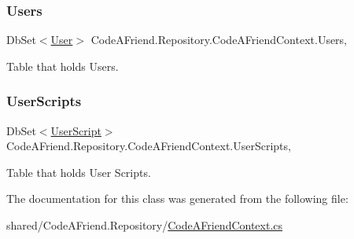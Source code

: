 \subsubsection{\texorpdfstring{Users}{Users}}
{\footnotesize\ttfamily Db\+Set$<$\mbox{\hyperlink{class_code_a_friend_1_1_data_model_1_1_user}{User}}$>$ Code\+A\+Friend.\+Repository.\+Code\+A\+Friend\+Context.\+Users\hspace{0.3cm}{\ttfamily [get]}, {\ttfamily [set]}}



Table that holds Users.

\mbox{\label{class_code_a_friend_1_1_repository_1_1_code_a_friend_context_aa2d9d4f6cf003b7ee1364c954ee3fad5}} 
\subsubsection{\texorpdfstring{User\+Scripts}{UserScripts}}
{\footnotesize\ttfamily Db\+Set$<$\mbox{\hyperlink{class_code_a_friend_1_1_data_model_1_1_user_script}{User\+Script}}$>$ Code\+A\+Friend.\+Repository.\+Code\+A\+Friend\+Context.\+User\+Scripts\hspace{0.3cm}{\ttfamily [get]}, {\ttfamily [set]}}



Table that holds User Scripts.



The documentation for this class was generated from the following file\+:\begin{DoxyCompactItemize}
\item 
shared/\+Code\+A\+Friend.\+Repository/\mbox{\hyperlink{_code_a_friend_context_8cs}{Code\+A\+Friend\+Context.\+cs}}\end{DoxyCompactItemize}
